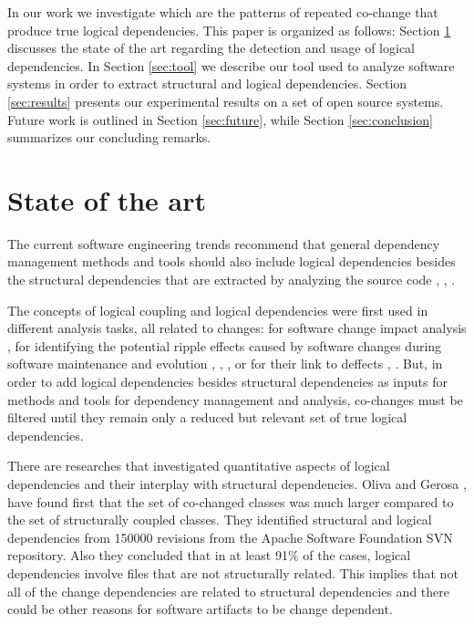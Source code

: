 \documentclass[conference]{IEEEtran}
\begin{document}
In our work we investigate which are the patterns of repeated co-change that produce true logical dependencies. This paper is organized as follows: Section \ref{sec:state} discusses the state of the art regarding the detection and usage of logical dependencies. In Section \ref{sec:tool} we describe our tool used to analyze software systems in order to extract structural and logical dependencies. Section \ref{sec:results} presents our experimental results on a set of open source systems. Future work is outlined in Section \ref{sec:future}, while Section \ref{sec:conclusion} summarizes our concluding remarks.



\section{State of the art}
\label{sec:state}
The current software engineering trends recommend that general dependency management methods and tools should also include logical dependencies besides the structural dependencies that are extracted by analyzing the source code \cite{Oliva:2011:ISL:2067853.2068086}, \cite{DBLP:journals/jss/AjienkaC17}, \cite{Yu2007}. 

The concepts of logical coupling and logical dependencies were first used in different analysis tasks, all related to changes: for software change impact analysis \cite{1553643}, for identifying the potential ripple effects caused by software changes during software maintenance and evolution \cite{DBLP:conf/issre/OlivaG15}, \cite{Oliva:2011:ISL:2067853.2068086}, \cite{Poshyvanyk2009}, \cite{posh2010} or for their link to deffects \cite{wiese}, \cite{Zimmermann:2004:MVH:998675.999460}. But, in order to add logical dependencies besides structural dependencies as inputs for methods and tools for dependency management and analysis, co-changes must be filtered until they remain only a reduced but relevant set of true logical dependencies. 

There are researches that investigated quantitative aspects of logical dependencies and their interplay with structural dependencies. 
Oliva and Gerosa \cite{Oliva:2011:ISL:2067853.2068086}, \cite{DBLP:conf/issre/OlivaG15} have found first that the set of co-changed classes was much larger compared to the set of structurally coupled classes. They identified structural and logical dependencies from 150000 revisions from the Apache Software Foundation SVN repository. Also they concluded  that in at least 91\% of the cases, logical dependencies involve files that are not structurally related. This implies that not all of the change dependencies are related to structural dependencies and there could be other reasons for software artifacts to be change dependent.
\end{document}
